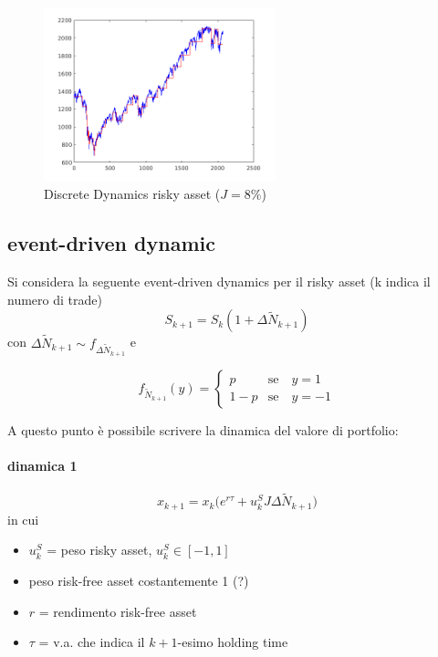 \documentclass[12pt]{article}
\theoremstyle{break}
\begin{document}
\begin{figure}[H]
	\caption{Discrete Dynamics risky asset ($J = 8\% $)}
	\centering
	\includegraphics[width=0.6\textwidth]{DiscreteDynamics.png}
\end{figure}

\subsection{event-driven dynamic}
Si considera la seguente event-driven dynamics per il risky asset (k indica il numero di trade)
\begin{equation}
  S_{k+1} = S_{k} (1 + \Delta \widetilde{N}_{k+1})
\end{equation}
con 
$\Delta \widetilde{N}_{k+1} \sim f_{\Delta \widetilde{N}_{k+1}}$ e

\[
f_{\widetilde{N}_{k+1}}(y) = 
\begin{cases}
p & \text{se} \quad y = 1 \\
1 - p & \text{se} \quad y = -1 
\end{cases}
\]

A questo punto è possibile scrivere la dinamica del valore di portfolio:
\paragraph{dinamica 1} 
\begin{equation} \label{eq:dinamica1}
x_{k+1} = x_k\Big(e^{r \tau} + u^{S}_k J \Delta \widetilde{N}_{k+1}  \Big)
\end{equation}
in cui 
\begin{itemize}
	\item $u^{S}_k$ = peso risky asset, $u^{S}_k \in [-1,1]$
	\item peso risk-free asset costantemente 1 (?)
	\item $r$ = rendimento risk-free asset
	\item $\tau$ =  v.a. che indica il $k+1$-esimo holding time
\end{itemize}
\end{document}
